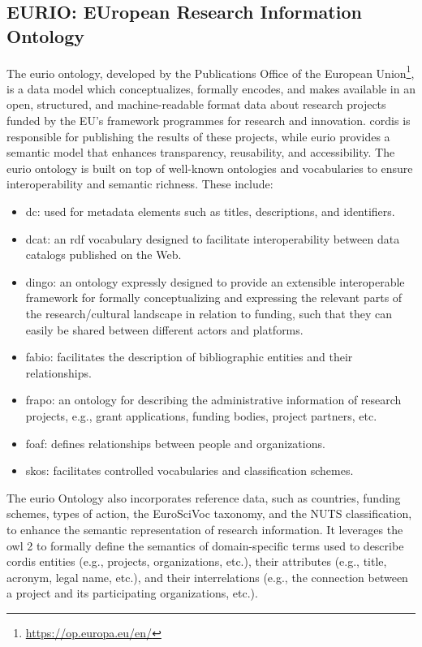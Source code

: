 \subsection*{EURIO: EUropean Research Information Ontology}
The \gls{eurio} ontology, developed by the Publications Office of the European Union\footnote{\url{https://op.europa.eu/en/}}, is a data model which conceptualizes, formally encodes, and makes available in an open, structured, and machine-readable format data about research projects funded by the EU's framework programmes for research and innovation.
\gls{cordis} is responsible for publishing the results of these projects, while \gls{eurio} provides a semantic model that enhances transparency, reusability, and accessibility.
The \gls{eurio} ontology is built on top of well-known ontologies and vocabularies to ensure interoperability and semantic richness.
These include:
\begin{itemize}
    \item \gls{dc}: used for metadata elements such as titles, descriptions, and identifiers.
    \item \gls{dcat}: an \gls{rdf} vocabulary designed to facilitate interoperability between data catalogs published on the Web.
    \item \gls{dingo}: an ontology expressly designed to provide an extensible interoperable framework for formally conceptualizing and expressing the relevant parts of the research/cultural landscape in relation to funding, such that they can easily be shared between different actors and platforms.
    \item \gls{fabio}: facilitates the description of bibliographic entities and their relationships.
    \item \gls{frapo}: an ontology for describing the administrative information of research projects, e.g., grant applications, funding bodies, project partners, etc.
    \item \gls{foaf}: defines relationships between people and organizations.
    \item \gls{skos}: facilitates controlled vocabularies and classification schemes.
\end{itemize}

The \gls{eurio} Ontology also incorporates reference data, such as countries, funding schemes, types of action, the EuroSciVoc taxonomy, and the NUTS classification, to enhance the semantic representation of research information.
It leverages the \gls{owl} 2 to formally define the semantics of domain-specific terms used to describe \gls{cordis} entities (e.g., projects, organizations, etc.), their attributes (e.g., title, acronym, legal name, etc.), and their interrelations (e.g., the connection between a project and its participating organizations, etc.).

